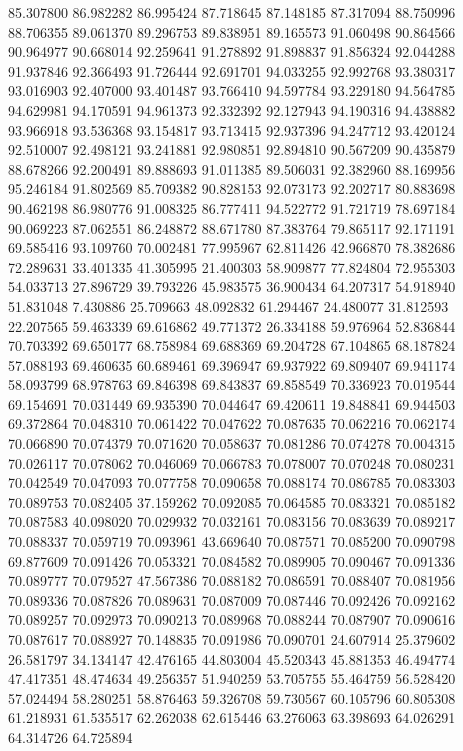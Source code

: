85.307800
86.982282
86.995424
87.718645
87.148185
87.317094
88.750996
88.706355
89.061370
89.296753
89.838951
89.165573
91.060498
90.864566
90.964977
90.668014
92.259641
91.278892
91.898837
91.856324
92.044288
91.937846
92.366493
91.726444
92.691701
94.033255
92.992768
93.380317
93.016903
92.407000
93.401487
93.766410
94.597784
93.229180
94.564785
94.629981
94.170591
94.961373
92.332392
92.127943
94.190316
94.438882
93.966918
93.536368
93.154817
93.713415
92.937396
94.247712
93.420124
92.510007
92.498121
93.241881
92.980851
92.894810
90.567209
90.435879
88.678266
92.200491
89.888693
91.011385
89.506031
92.382960
88.169956
95.246184
91.802569
85.709382
90.828153
92.073173
92.202717
80.883698
90.462198
86.980776
91.008325
86.777411
94.522772
91.721719
78.697184
90.069223
87.062551
86.248872
88.671780
87.383764
79.865117
92.171191
69.585416
93.109760
70.002481
77.995967
62.811426
42.966870
78.382686
72.289631
33.401335
41.305995
21.400303
58.909877
77.824804
72.955303
54.033713
27.896729
39.793226
45.983575
36.900434
64.207317
54.918940
51.831048
7.430886
25.709663
48.092832
61.294467
24.480077
31.812593
22.207565
59.463339
69.616862
49.771372
26.334188
59.976964
52.836844
70.703392
69.650177
68.758984
69.688369
69.204728
67.104865
68.187824
57.088193
69.460635
60.689461
69.396947
69.937922
69.809407
69.941174
58.093799
68.978763
69.846398
69.843837
69.858549
70.336923
70.019544
69.154691
70.031449
69.935390
70.044647
69.420611
19.848841
69.944503
69.372864
70.048310
70.061422
70.047622
70.087635
70.062216
70.062174
70.066890
70.074379
70.071620
70.058637
70.081286
70.074278
70.004315
70.026117
70.078062
70.046069
70.066783
70.078007
70.070248
70.080231
70.042549
70.047093
70.077758
70.090658
70.088174
70.086785
70.083303
70.089753
70.082405
37.159262
70.092085
70.064585
70.083321
70.085182
70.087583
40.098020
70.029932
70.032161
70.083156
70.083639
70.089217
70.088337
70.059719
70.093961
43.669640
70.087571
70.085200
70.090798
69.877609
70.091426
70.053321
70.084582
70.089905
70.090467
70.091336
70.089777
70.079527
47.567386
70.088182
70.086591
70.088407
70.081956
70.089336
70.087826
70.089631
70.087009
70.087446
70.092426
70.092162
70.089257
70.092973
70.090213
70.089968
70.088244
70.087907
70.090616
70.087617
70.088927
70.148835
70.091986
70.090701
24.607914
25.379602
26.581797
34.134147
42.476165
44.803004
45.520343
45.881353
46.494774
47.417351
48.474634
49.256357
51.940259
53.705755
55.464759
56.528420
57.024494
58.280251
58.876463
59.326708
59.730567
60.105796
60.805308
61.218931
61.535517
62.262038
62.615446
63.276063
63.398693
64.026291
64.314726
64.725894
